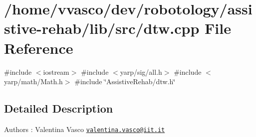 \section{/home/vvasco/dev/robotology/assistive-\/rehab/lib/src/dtw.cpp File Reference}
\label{dtw_8cpp}
{\ttfamily \#include $<$iostream$>$}\newline
{\ttfamily \#include $<$yarp/sig/all.\+h$>$}\newline
{\ttfamily \#include $<$yarp/math/\+Math.\+h$>$}\newline
{\ttfamily \#include \char`\"{}Assistive\+Rehab/dtw.\+h\char`\"{}}\newline


\subsection{Detailed Description}
\begin{DoxyAuthor}{Authors}
\+: Valentina Vasco \href{mailto:valentina.vasco@iit.it}{\tt valentina.\+vasco@iit.\+it} 
\end{DoxyAuthor}
